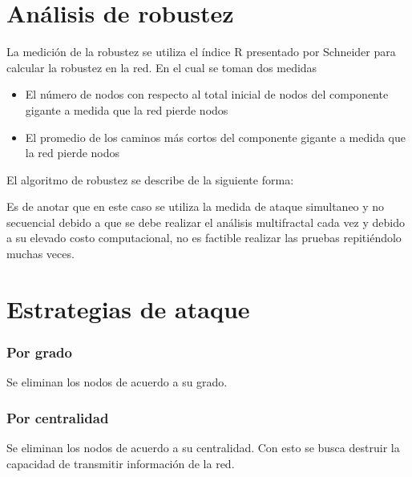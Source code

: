 \section{Análisis de robustez}

La medición de la robustez se utiliza el índice R presentado por Schneider\cite{Schneider2011} para calcular la robustez en la red. En el cual se toman dos medidas

\begin{itemize}
    \item El número de nodos con respecto al total inicial de nodos del componente gigante a medida que la red pierde nodos
    \item El promedio de los caminos más cortos del componente gigante a medida que la red pierde nodos
\end{itemize}

El algoritmo de robustez se describe de la siguiente forma:


Es de anotar que en este caso se utiliza la medida de ataque simultaneo y no secuencial debido a que se debe realizar el análisis multifractal cada vez y debido a su elevado costo computacional, no es factible realizar las pruebas repitiéndolo muchas veces.

\section{Estrategias de ataque}


\subsubsection{Por grado}

Se eliminan los nodos de acuerdo a su grado.

\subsubsection{Por centralidad}

Se eliminan los nodos de acuerdo a su centralidad. Con esto se busca destruir la capacidad de transmitir información de la red.